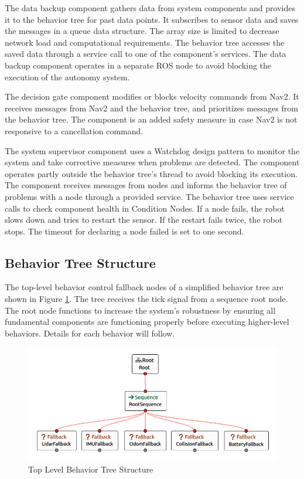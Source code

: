 \documentclass[letterpaper, 10pt, conference]{ieeeconf}
\begin{document}
The data backup component gathers data from system components and provides it to the behavior tree for past data points. It subscribes to sensor data and saves the messages in a queue data structure. The array size is limited to decrease network load and computational requirements. The behavior tree accesses the saved data through a service call to one of the component's services. The data backup component operates in a separate ROS node to avoid blocking the execution of the autonomy system.

The decision gate component modifies or blocks velocity commands from Nav2. It receives messages from Nav2 and the behavior tree, and prioritizes messages from the behavior tree. The component is an added safety measure in case Nav2 is not responsive to a cancellation command.

The system supervisor component uses a Watchdog design pattern to monitor the system and take corrective measures when problems are detected. The component operates partly outside the behavior tree's thread to avoid blocking its execution. The component receives messages from nodes and informs the behavior tree of problems with a node through a provided service. The behavior tree uses service calls to check component health in Condition Nodes. If a node fails, the robot slows down and tries to restart the sensor. If the restart fails twice, the robot stops. The timeout for declaring a node failed is set to one second.

\subsection{Behavior Tree Structure}

The top-level behavior control fallback nodes of a simplified behavior tree are shown in Figure \ref{fig:top_level_bt}. The tree receives the tick signal from a sequence root node. The root node functions to increase the system's robustness by ensuring all fundamental components are functioning properly before executing higher-level behaviors. Details for each behavior will follow.

\begin{figure}[ht]
	\centering
	\includegraphics[width=0.9\linewidth]{Figures/top_level_bt.png}
	\caption{Top Level Behavior Tree Structure}
	\label{fig:top_level_bt}
\end{figure}
\end{document}
